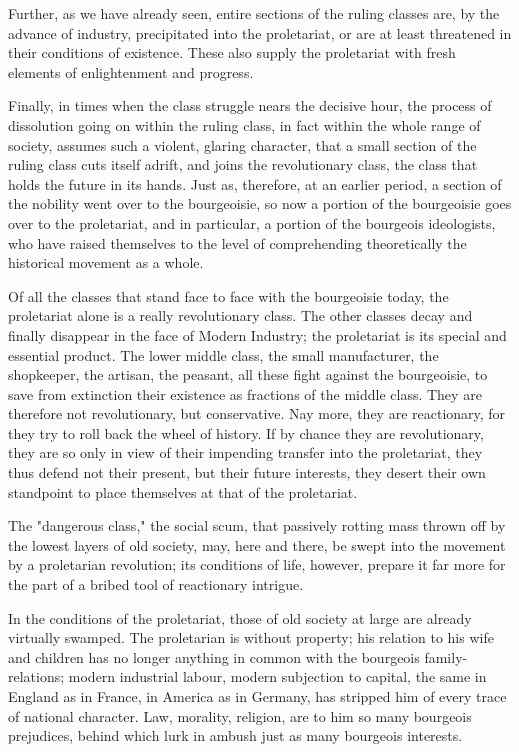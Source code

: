 \documentclass[11pt]{book}
\begin{document}
Further, as we have already seen, entire sections of the ruling
classes are, by the advance of industry, precipitated into the
proletariat, or are at least threatened in their conditions of
existence.  These also supply the proletariat with fresh elements
of enlightenment and progress.

Finally, in times when the class struggle nears the decisive
hour, the process of dissolution going on within the ruling
class, in fact within the whole range of society, assumes such a
violent, glaring character, that a small section of the ruling
class cuts itself adrift, and joins the revolutionary class, the
class that holds the future in its hands.  Just as, therefore, at
an earlier period, a section of the nobility went over to the
bourgeoisie, so now a portion of the bourgeoisie goes over to the
proletariat, and in particular, a portion of the bourgeois
ideologists, who have raised themselves to the level of
comprehending theoretically the historical movement as a whole.

Of all the classes that stand face to face with the bourgeoisie
today, the proletariat alone is a really revolutionary class.
The other classes decay and finally disappear in the face of
Modern Industry; the proletariat is its special and essential
product.  The lower middle class, the small manufacturer, the
shopkeeper, the artisan, the peasant, all these fight against the
bourgeoisie, to save from extinction their existence as fractions
of the middle class.  They are therefore not revolutionary, but
conservative.  Nay more, they are reactionary, for they try
to roll back the wheel of history.  If by chance they are
revolutionary, they are so only in view of their impending
transfer into the proletariat, they thus defend not their
present, but their future interests, they desert their own
standpoint to place themselves at that of the proletariat.

The "dangerous class," the social scum, that passively rotting
mass thrown off by the lowest layers of old society, may,
here and there, be swept into the movement by a proletarian
revolution; its conditions of life, however, prepare it far more
for the part of a bribed tool of reactionary intrigue.

In the conditions of the proletariat, those of old society at
large are already virtually swamped.  The proletarian is without
property; his relation to his wife and children has no longer
anything in common with the bourgeois family-relations; modern
industrial labour, modern subjection to capital, the same in
England as in France, in America as in Germany, has stripped him
of every trace of national character.  Law, morality, religion,
are to him so many bourgeois prejudices, behind which lurk in
ambush just as many bourgeois interests.
\end{document}
